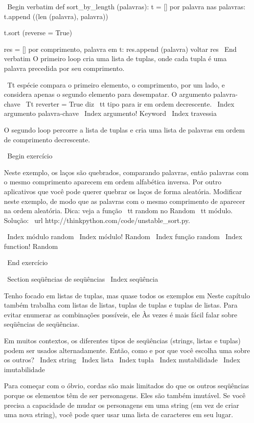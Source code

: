 \documentclass[10pt]{book}
\begin{document}
\begin {itemize}
{{{{{{{{{\ Begin {verbatim}
def sort_by_length (palavras):
    t = []
    por palavra nas palavras:
       t.append ((len (palavra), palavra))

    t.sort (reverse = True)

    res = []
    por comprimento, palavra em t:
        res.append (palavra)
    voltar res
\ End {verbatim}
%
O primeiro loop cria uma lista de tuplas, onde cada
tupla é uma palavra precedida por seu comprimento.

{\ Tt espécie} compara o primeiro elemento, o comprimento, por um lado, e
considera apenas o segundo elemento para desempatar. O argumento palavra-chave
{\ Tt reverter = True} diz {\ tt tipo} para ir em ordem decrescente.
\ Index {argumento palavra-chave}
\ Index {argumento! Keyword}
\ Index {travessia}

O segundo loop percorre a lista de tuplas e cria uma lista de
palavras em ordem de comprimento decrescente.

\ Begin {} exercício

Neste exemplo, os laços são quebrados, comparando palavras, então palavras
com o mesmo comprimento aparecem em ordem alfabética inversa. Por outro
aplicativos que você pode querer quebrar os laços de forma aleatória. Modificar
neste exemplo, de modo que as palavras com o mesmo comprimento de aparecer na
ordem aleatória. Dica: veja a função {\ tt random} no
{Random \ tt} módulo.
Solução: \ url {http://thinkpython.com/code/unstable_sort.py}.

\ Index {módulo random}
\ Index {módulo! Random}
\ Index {função random}
\ Index {function! Random}

\ End {} exercício


\ Section {seqüências de seqüências}
\ Index {seqüência}

Tenho focado em listas de tuplas, mas quase todos os exemplos em
Neste capítulo também trabalha com listas de listas, tuplas de tuplas e
tuplas de listas. Para evitar enumerar as combinações possíveis, ele
Às vezes é mais fácil falar sobre seqüências de seqüências.

Em muitos contextos, os diferentes tipos de seqüências (strings, listas e
tuplas) podem ser usados ​​alternadamente. Então, como e por que você escolha uma
sobre os outros?
\ Index {string}
\ Index {lista}
\ Index {} tupla
\ Index {} mutabilidade
\ Index {imutabilidade}

Para começar com o óbvio, cordas são mais limitados do que os outros
seqüências porque os elementos têm de ser personagens. Eles são
também imutável. Se você precisa a capacidade de mudar os personagens
em uma string (em vez de criar uma nova string), você pode
quer usar uma lista de caracteres em seu lugar.

}}}}}}}}}
\end{itemize}
\end{document}
